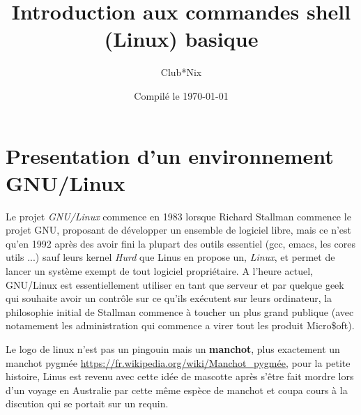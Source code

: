 \documentclass[french, a4paper, 12pt, titlepage]{article}
\begin{document}
\title{Introduction aux commandes shell (Linux) basique}
\author{Club*Nix}
\date{Compilé le \today}

\maketitle

\vfill
\pagebreak

\newpage
\strut\thispagestyle{empty}
\vfill
\pagebreak
\tableofcontents
\strut\thispagestyle{empty}
\newpage
\setcounter{page}{1}

\section{Presentation d'un environnement GNU/Linux}
Le projet \textit{GNU/Linux} commence en 1983 lorsque Richard Stallman commence le projet GNU, proposant de développer un ensemble de logiciel libre, mais ce n'est qu'en 1992 après des avoir fini la plupart des outils essentiel (gcc, emacs, les cores utils ...) sauf leurs kernel \textit{Hurd} que Linus en propose un, \textit{Linux}, et permet de lancer un système exempt de tout logiciel propriétaire.
A l'heure actuel, GNU/Linux est essentiellement utiliser en tant que serveur et par quelque geek qui souhaite avoir un contrôle sur ce qu'ils exécutent sur leurs ordinateur, la philosophie initial de Stallman commence à toucher un plus grand publique (avec notamement les administration qui commence a virer tout les produit Micro\$oft).

Le logo de linux n'est pas un pingouin mais un \textbf{manchot}, plus exactement un manchot pygmée \url{https://fr.wikipedia.org/wiki/Manchot_pygmée}, pour la petite histoire, Linus est revenu avec cette idée de mascotte après s'être fait mordre lors d'un voyage en Australie par cette même espèce de manchot et coupa cours à la discution qui se portait sur un requin.
\end{document}
